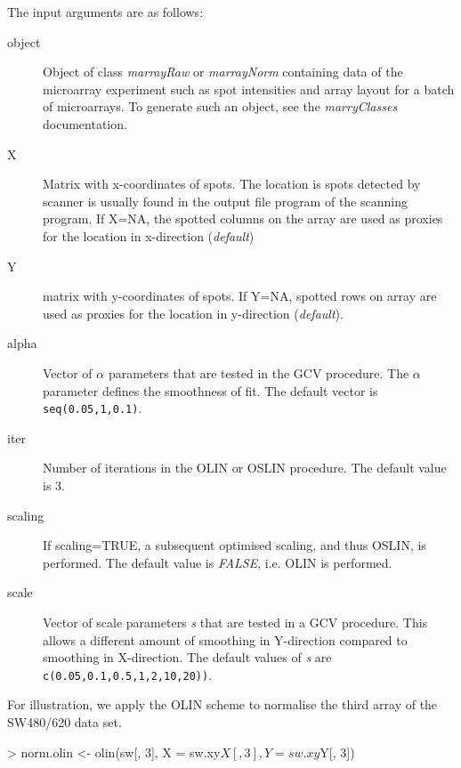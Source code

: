 \documentclass[a4paper,11pt]{article}
\begin{document}
\noindent The input arguments are  as follows:
           \begin{description}
           \item[object] Object of class \emph{marrayRaw} or \emph{marrayNorm} containing 
                         data of the microarray experiment such as spot intensities and array layout
                         for a batch of microarrays.
                         To generate such an object, see the \emph{marryClasses} documentation.
           \item[X]      Matrix with x-coordinates of spots. The location is spots detected by scanner
                         is usually 
                         found in the output file program of  the scanning program. 
                          If X=NA, the spotted columns on the  array are used as proxies for the location in x-direction (\emph{default})
           \item[Y] matrix with y-coordinates of spots. If Y=NA, spotted rows on array are used
            as proxies for the location in y-direction (\emph{default}).
           \item[alpha] Vector of $\alpha$  parameters that are tested in the GCV procedure. The $\alpha$  parameter 
                  defines the smoothness of fit.  The default vector is \texttt{seq(0.05,1,0.1)}.
           \item[iter] Number of iterations in the OLIN or OSLIN procedure. The default value is 3. 
           \item[scaling] If scaling=TRUE, a subsequent optimised scaling, and thus OSLIN,  is performed.
                         The default value is \emph{FALSE}, i.e. OLIN is performed. 
           \item[scale] Vector of scale parameters \emph{s} that are tested in a GCV procedure. 
                    This  allows  a different amount of smoothing in Y-direction compared 
                    to smoothing in X-direction. The default values of \emph{s} are 
                    \texttt{c(0.05,0.1,0.5,1,2,10,20))}.
      \end{description}


For illustration, we apply the OLIN scheme to normalise the third array of the SW480/620 data set. 
\begin{Schunk}
\begin{Sinput}
> norm.olin <- olin(sw[, 3], X = sw.xy$X[, 3], Y = sw.xy$Y[, 3])
\end{Sinput}
\end{Schunk}
\end{document}
